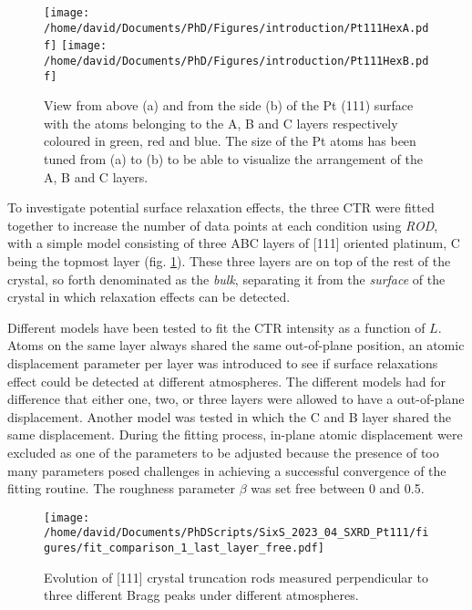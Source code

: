 \begin{figure}[!htb]
    \centering
    \texttt{[image: /home/david/Documents/PhD/Figures/introduction/Pt111HexA.pdf]}
    \texttt{[image: /home/david/Documents/PhD/Figures/introduction/Pt111HexB.pdf]}
    \caption{
        View from above (a) and from the side (b) of the Pt (111) surface with the atoms belonging to the A, B and C layers respectively coloured in green, red and blue.
        The size of the Pt atoms has been tuned from (a) to (b) to be able to visualize the arrangement of the A, B and C layers.
    }
    \label{fig:Pt111StructureSideAndTop}
\end{figure}

To investigate potential surface relaxation effects, the three CTR were fitted together to increase the number of data points at each condition using \textit{ROD}, with a simple model consisting of three ABC layers of [111] oriented platinum, C being the topmost layer (fig. \ref{fig:Pt111StructureSideAndTop}).
These three layers are on top of the rest of the crystal, so forth denominated as the \textit{bulk}, separating it from the \textit{surface} of the crystal in which relaxation effects can be detected.

Different models have been tested to fit the CTR intensity as a function of $L$.
Atoms on the same layer always shared the same out-of-plane position, an atomic displacement parameter per layer was introduced to see if surface relaxations effect could be detected at different atmospheres.
The different models had for difference that either one, two, or three layers were allowed to have a out-of-plane displacement.
Another model was tested in which the C and B layer shared the same displacement.
During the fitting process, in-plane atomic displacement were excluded as one of the parameters to be adjusted because the presence of too many parameters posed challenges in achieving a successful convergence of the fitting routine.
The roughness parameter $\beta$ was set free between 0 and 0.5.%

\begin{figure}[!htb]
    \centering
    \texttt{[image: /home/david/Documents/PhDScripts/SixS\_2023\_04\_SXRD\_Pt111/figures/fit\_comparison\_1\_last\_layer\_free.pdf]}
    \caption{
        Evolution of [111] crystal truncation rods measured perpendicular to three different Bragg peaks under different atmospheres.
    }
    \label{fig:CTRFit111}
\end{figure}

